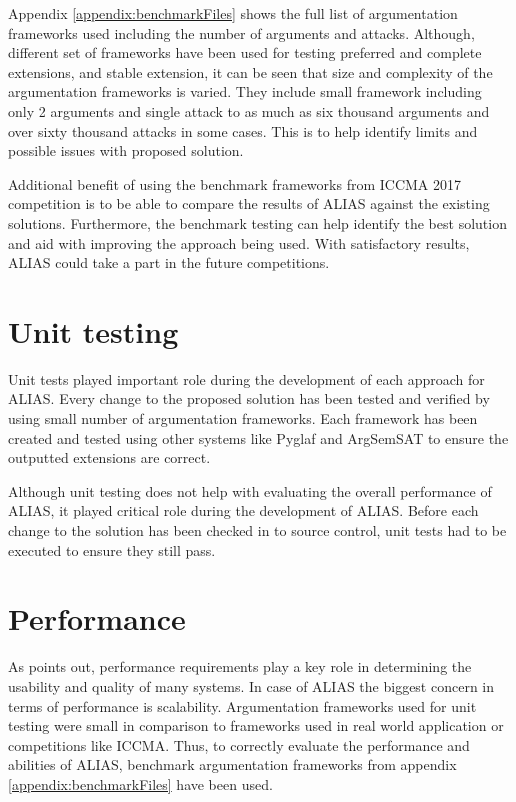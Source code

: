 Appendix \ref{appendix:benchmarkFiles} shows the full list of argumentation frameworks used including the number of arguments and attacks. Although, different set of frameworks have been used for testing preferred and complete extensions, and stable extension, it can be seen that size and complexity of the argumentation frameworks is varied. They include small framework including only 2 arguments and single attack to as much as six thousand arguments and over sixty thousand attacks in some cases. This is to help identify limits and possible issues with proposed solution. 

Additional benefit of using the benchmark frameworks from ICCMA 2017 competition is to be able to compare the results of ALIAS against the existing solutions. Furthermore, the benchmark testing can help identify the best solution and aid with improving the approach being used. With satisfactory results, ALIAS could take a part in the future competitions.

\section{Unit testing}
Unit tests played important role during the development of each approach for ALIAS. Every change to the proposed solution has been tested and verified by using small number of argumentation frameworks. Each framework has been created and tested using other systems like Pyglaf and ArgSemSAT to ensure the outputted extensions are correct. 

Although unit testing does not help with evaluating the overall performance of ALIAS, it played critical role during the development of ALIAS. Before each change to the solution has been checked in to source control, unit tests had to be executed to ensure they still pass. 

\section{Performance}
As \citet{performanceTesting1} points out, performance requirements play a key role in determining the usability and quality of many systems. In case of ALIAS the biggest concern in terms of performance is scalability. Argumentation frameworks used for unit testing were small in comparison to frameworks used in real world application or competitions like ICCMA. Thus, to correctly evaluate the performance and abilities of ALIAS, benchmark argumentation frameworks from appendix \ref{appendix:benchmarkFiles} have been used.

